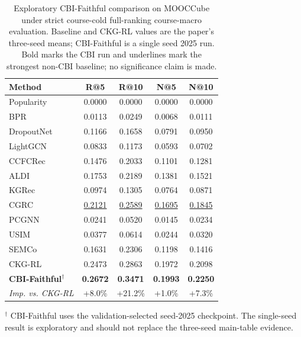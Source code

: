 \begin{table}[t]
\centering
{
\small
\setlength{\tabcolsep}{5.5pt}
\renewcommand{\arraystretch}{0.98}
\begin{tabular*}{\textwidth}{@{\extracolsep{\fill}}lcccc}
\toprule
Method & R@5 & R@10 & N@5 & N@10 \\
\midrule
Popularity & 0.0000 & 0.0000 & 0.0000 & 0.0000 \\
BPR & 0.0113 & 0.0249 & 0.0068 & 0.0111 \\
DropoutNet & 0.1166 & 0.1658 & 0.0791 & 0.0950 \\
LightGCN & 0.0833 & 0.1173 & 0.0593 & 0.0702 \\
CCFCRec & 0.1476 & 0.2033 & 0.1101 & 0.1281 \\
ALDI & 0.1753 & 0.2189 & 0.1381 & 0.1521 \\
KGRec & 0.0974 & 0.1305 & 0.0764 & 0.0871 \\
CGRC & \underline{0.2121} & \underline{0.2589} & \underline{0.1695} & \underline{0.1845} \\
PCGNN & 0.0241 & 0.0520 & 0.0145 & 0.0234 \\
USIM & 0.0377 & 0.0614 & 0.0244 & 0.0320 \\
SEMCo & 0.1631 & 0.2306 & 0.1198 & 0.1416 \\
CKG-RL & 0.2473 & 0.2863 & 0.1972 & 0.2098 \\
\textbf{CBI-Faithful}$^\dagger$ & \textbf{0.2672} & \textbf{0.3471} & \textbf{0.1993} & \textbf{0.2250} \\
\midrule
\emph{Imp. vs. CKG-RL} & +8.0\% & +21.2\% & +1.0\% & +7.3\% \\
\bottomrule
\end{tabular*}
}
\caption{Exploratory CBI-Faithful comparison on MOOCCube under strict course-cold full-ranking course-macro evaluation. Baseline and CKG-RL values are the paper's three-seed means; CBI-Faithful is a single seed 2025 run. Bold marks the CBI run and underlines mark the strongest non-CBI baseline; no significance claim is made.}
\label{tab:cbi-main-table-comparison}
\vspace{2pt}
\parbox{\textwidth}{\footnotesize $^\dagger$ CBI-Faithful uses the validation-selected seed-2025 checkpoint. The single-seed result is exploratory and should not replace the three-seed main-table evidence.}
\end{table}
